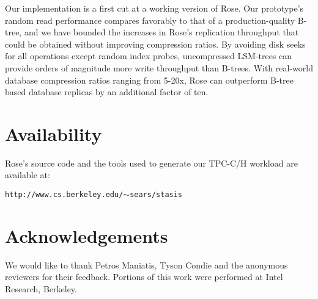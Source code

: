 \documentclass{vldb}
\newcommand{\rows}{Rose\xspace}
\newcommand{\rowss}{Rose's\xspace}
\begin{document}

Our implementation is a first cut at a working version of \rows.
Our prototype's random read performance compares favorably to that of a production-quality B-tree, and we have
bounded the increases in \rowss replication throughput that could be obtained without improving compression ratios.
By avoiding disk seeks for all operations except
random index probes, uncompressed LSM-trees can provide orders of magnitude more write throughput than 
B-trees.  With real-world
database compression ratios ranging from 5-20x, \rows
can outperform B-tree based database replicas by an
additional factor of ten.


\section{Availability}
\label{sec:avail}
\rowss source code and the tools used to generate our TPC-C/H workload
are available at:

{\tt http://www.cs.berkeley.edu/$\sim$sears/stasis}

\section{Acknowledgements}

We would like to thank Petros Maniatis, Tyson Condie and the
anonymous reviewers for their feedback.  Portions of this work were
performed at Intel Research, Berkeley.


%
%
\balancecolumns %
\end{document}
